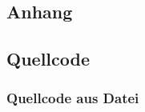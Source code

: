 
\begin{appendices}
	\renewcommand{\thechapter}{\alph{chapter}}
	\renewcommand{\thesection}{\Alph{section}}
	\chapter{Anhang}
	\section{Quellcode}
	\subsection{Quellcode aus Datei}
		
\end{appendices}
